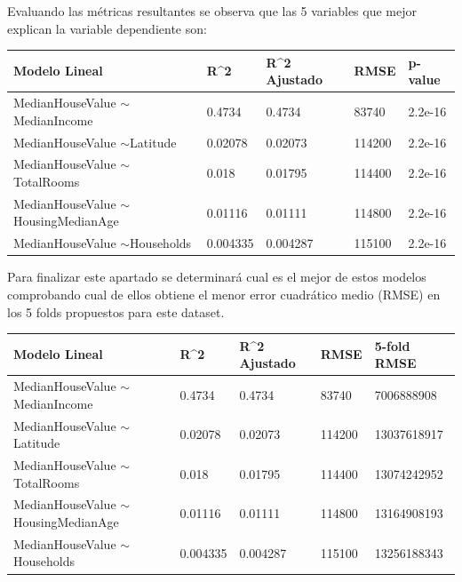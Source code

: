 Evaluando las métricas resultantes se observa que las 5 variables que mejor explican la variable dependiente son:
\begin{table}[!h]
	\begin{tabular}{l|llll}
		Modelo Lineal                           & R\textasciicircum{}2 & R\textasciicircum{}2 Ajustado & RMSE   & p-value \\ \hline
		MedianHouseValue $\sim$MedianIncome     & 0.4734               & 0.4734                        & 83740  & 2.2e-16 \\
		MedianHouseValue $\sim$Latitude         & 0.02078              & 0.02073                       & 114200 & 2.2e-16 \\
		MedianHouseValue $\sim$TotalRooms       & 0.018                & 0.01795                       & 114400 & 2.2e-16 \\
		MedianHouseValue $\sim$HousingMedianAge & 0.01116              & 0.01111                       & 114800 & 2.2e-16 \\
		MedianHouseValue $\sim$Households       & 0.004335             & 0.004287                      & 115100 & 2.2e-16
	\end{tabular}
\end{table}


Para finalizar este apartado se determinará cual es el mejor de estos modelos comprobando cual de ellos obtiene el menor error cuadrático medio (RMSE) en los 5 folds propuestos para este dataset.
\begin{table}[!h]
	\begin{tabular}{l|llll}
		Modelo Lineal                           & R\textasciicircum{}2 & R\textasciicircum{}2 Ajustado & RMSE   & 5-fold RMSE \\ \hline
		MedianHouseValue $\sim$MedianIncome     & 0.4734               & 0.4734                        & 83740  & 7006888908  \\
		MedianHouseValue $\sim$Latitude         & 0.02078              & 0.02073                       & 114200 & 13037618917 \\
		MedianHouseValue $\sim$TotalRooms       & 0.018                & 0.01795                       & 114400 & 13074242952 \\
		MedianHouseValue $\sim$HousingMedianAge & 0.01116              & 0.01111                       & 114800 & 13164908193 \\
		MedianHouseValue $\sim$Households       & 0.004335             & 0.004287                      & 115100 & 13256188343
	\end{tabular}
\end{table}

